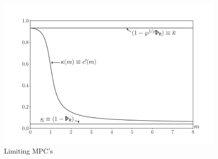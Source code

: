 \hypertarget{MPCLimits}{}
\begin{figure}
\centerline{\includegraphics[width=6in]{Figures/MPCLimits}}
\caption{Limiting MPC's}
\label{fig:mpclimits}
\end{figure}
